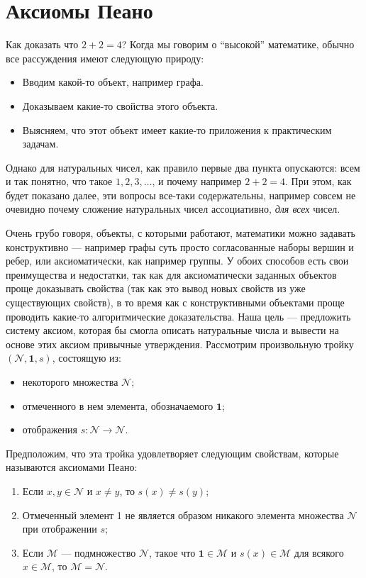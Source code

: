 \documentclass{article}
\begin{document}
\section{Аксиомы Пеано}

Как доказать что \(2 + 2 = 4\)? Когда мы говорим о \enquote{высокой} математике, обычно все рассуждения имеют следующую природу:
\begin{itemize}[noitemsep, topsep=0pt, parsep=0pt]
    \item Вводим какой-то объект, например графа.
    \item Доказываем какие-то свойства этого объекта. 
    \item Выясняем, что этот объект имеет какие-то приложения к практическим задачам.
\end{itemize} 
Однако для натуральных чисел, как правило первые два пункта опускаются: всем и так понятно, что такое \(1, 2, 3, \ldots\), и почему например \(2 + 2 = 4\). При этом, как будет показано далее, эти вопросы все-таки содержательны, например совсем не очевидно почему сложение натуральных чисел ассоциативно, \textit{для всех} чисел. 

Очень грубо говоря, объекты, с которыми работают, математики можно задавать конструктивно --- например графы суть просто согласованные наборы вершин и ребер, или аксиоматически, как например группы. У обоих способов есть свои преимущества и недостатки, так как для аксиоматически заданных объектов проще доказывать свойства (так как это вывод новых свойств из уже существующих свойств), в то время как с конструктивными объектами проще проводить какие-то алгоритмические доказательства.  Наша цель --- предложить систему аксиом, которая бы смогла описать натуральные числа и вывести на основе этих аксиом привычные утверждения. Рассмотрим произвольную тройку \((\mathcal{N}, \mathbf{1}, s)\), состоящую из:
\begin{itemize}[noitemsep, parsep=0pt, topsep=0pt] 
    \item некоторого множества \(\mathcal{N} \);
    \item отмеченного в нем элемента, обозначаемого \(\mathbf{1}\);
    \item отображения \(s\colon \mathcal{N} \rightarrow \mathcal{N} \).
\end{itemize}
Предположим, что эта тройка удовлетворяет следующим свойствам, которые называются аксиомами Пеано:
\begin{enumerate}[noitemsep, parsep=0pt, topsep=0pt, label=(Пе\arabic*)] 
    \item \label{ax::pa1} Если \( x, y \in \mathcal{N} \) и \( x \neq y \), то \( s(x) \neq s(y) \);
    \item \label{ax::pa2} Отмеченный элемент 1 не является образом никакого элемента множества \( \mathcal{N} \) при отображении \( s \);
    \item \label{ax::pa3} Если \( \mathcal{M} \) --- подмножество \( \mathcal{N} \), такое что \( \mathbf{1} \in \mathcal{M} \) и \( s(x) \in \mathcal{M} \) для всякого \( x \in \mathcal{M} \), то \( \mathcal{M} = \mathcal{N} \).
\end{enumerate}
\end{document}
